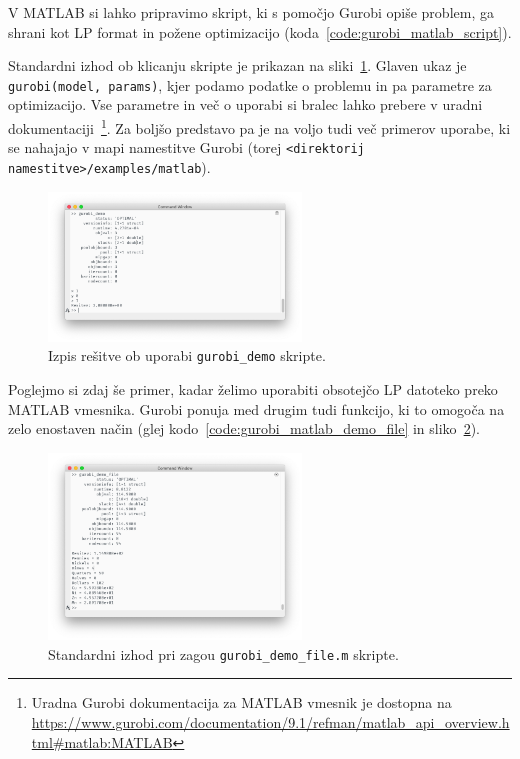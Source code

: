 \documentclass[a4paper,11pt]{article}
\begin{document}
V MATLAB si lahko pripravimo skript, ki s pomočjo Gurobi opiše problem, ga shrani kot LP format in požene optimizacijo (koda~\ref{code:gurobi_matlab_script}).



Standardni izhod ob klicanju skripte je prikazan na sliki~\ref{img:gurobi_matlab_demo_run}. Glaven ukaz je \texttt{gurobi(model, params)}, kjer podamo podatke o problemu in pa parametre za optimizacijo. Vse parametre in več o uporabi si bralec lahko prebere v uradni dokumentaciji~\footnote{Uradna Gurobi dokumentacija za MATLAB vmesnik je dostopna na \url{https://www.gurobi.com/documentation/9.1/refman/matlab\_api\_overview.html\#matlab:MATLAB}}. Za boljšo predstavo pa je na voljo tudi več primerov uporabe, ki se nahajajo v mapi namestitve Gurobi (torej \texttt{\textless direktorij namestitve\textgreater /examples/matlab}).
\begin{figure}[hbpt]
	\centering
	\includegraphics[width=0.6\textwidth]{images/gurobi_matlab_demo_run.png}
	\caption{Izpis rešitve ob uporabi \texttt{gurobi\_demo} skripte.}
	\label{img:gurobi_matlab_demo_run}
\end{figure}

Poglejmo si zdaj še primer, kadar želimo uporabiti obsotejčo LP datoteko preko MATLAB vmesnika. Gurobi ponuja med drugim tudi funkcijo, ki to omogoča na zelo enostaven način (glej kodo~\ref{code:gurobi_matlab_demo_file} in sliko~\ref{img:matlab_gurobi_demo_file}).


\begin{figure}[htpb]
	\centering
	\includegraphics[width=0.6\textwidth]{images/gurobi_matlab_demo_file.png}
	\caption{Standardni izhod pri zagou \texttt{gurobi\_demo\_file.m} skripte.}
	\label{img:matlab_gurobi_demo_file}
\end{figure}
\end{document}
